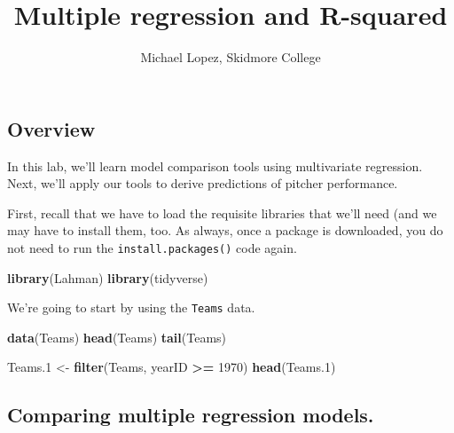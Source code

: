 \documentclass[]{article}
\title{Multiple regression and R-squared}
\author{Michael Lopez, Skidmore College}
\date{}
\newenvironment{Shaded}{\begin{snugshade}}{\end{snugshade}}
\newcommand{\DecValTok}[1]{\textcolor[rgb]{0.00,0.00,0.81}{#1}}
\newcommand{\FloatTok}[1]{\textcolor[rgb]{0.00,0.00,0.81}{#1}}
\newcommand{\KeywordTok}[1]{\textcolor[rgb]{0.13,0.29,0.53}{\textbf{#1}}}
\newcommand{\NormalTok}[1]{#1}
\newcommand{\OperatorTok}[1]{\textcolor[rgb]{0.81,0.36,0.00}{\textbf{#1}}}
\newcommand{\StringTok}[1]{\textcolor[rgb]{0.31,0.60,0.02}{#1}}
\begin{document}
\maketitle

\hypertarget{overview}{%
\subsection{Overview}\label{overview}}

In this lab, we'll learn model comparison tools using multivariate
regression. Next, we'll apply our tools to derive predictions of pitcher
performance.

First, recall that we have to load the requisite libraries that we'll
need (and we may have to install them, too. As always, once a package is
downloaded, you do not need to run the \texttt{install.packages()} code
again.

\begin{Shaded}
\begin{Highlighting}[]
\KeywordTok{library}\NormalTok{(Lahman)}
\KeywordTok{library}\NormalTok{(tidyverse)}
\end{Highlighting}
\end{Shaded}

We're going to start by using the \texttt{Teams} data.

\begin{Shaded}
\begin{Highlighting}[]
\KeywordTok{data}\NormalTok{(Teams)}
\KeywordTok{head}\NormalTok{(Teams)}
\KeywordTok{tail}\NormalTok{(Teams)}
\end{Highlighting}
\end{Shaded}

\begin{Shaded}
\begin{Highlighting}[]
\NormalTok{Teams}\FloatTok{.1}\NormalTok{ <-}\StringTok{ }\KeywordTok{filter}\NormalTok{(Teams, yearID }\OperatorTok{>=}\StringTok{ }\DecValTok{1970}\NormalTok{)}
\KeywordTok{head}\NormalTok{(Teams}\FloatTok{.1}\NormalTok{)}
\end{Highlighting}
\end{Shaded}

\hypertarget{comparing-multiple-regression-models.}{%
\subsection{Comparing multiple regression
models.}\label{comparing-multiple-regression-models.}}
\end{document}
